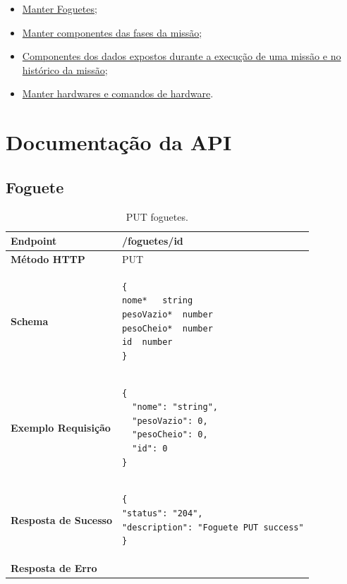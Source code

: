 \begin{apendicesenv}
\begin{itemize} 
    \item \href{https://github.com/Ground-Station/frontend/tree/material/ground-station/src/views/Rocket}{Manter Foguetes};
    \item \href{https://github.com/Ground-Station/frontend/tree/material/ground-station/src/views/Mission}{Manter componentes das fases da missão};
    \item \href{https://github.com/Ground-Station/frontend/tree/material/ground-station/src/views/Mission/MissionData}{Componentes dos dados expostos durante a execução de uma missão e no histórico da missão};
    \item \href{https://github.com/Ground-Station/frontend/tree/material/ground-station/src/views/Hardware}{Manter hardwares e comandos de hardware}.
\end{itemize}

\chapter{Documentação da API}
\label{documentacao_api}

\section{Foguete}
\begin{table}[H]
\begin{tabular}{|l|l|}
\hline
\textbf{Endpoint}            & /foguetes/{id} \\ \hline
\textbf{Método HTTP}         & PUT \\ \hline
\textbf{Schema}              &  
\begin{lstlisting}
{
nome*	string
pesoVazio*	number
pesoCheio*	number
id	number
}
\end{lstlisting}\\ \hline
\textbf{Exemplo Requisição}  &  
\begin{lstlisting}
{
  "nome": "string",
  "pesoVazio": 0,
  "pesoCheio": 0,
  "id": 0
}
\end{lstlisting}
\\ \hline
\textbf{Resposta de Sucesso} & 
\begin{lstlisting}
{
"status": "204",
"description": "Foguete PUT success"
}
\end{lstlisting}
\\ \hline
\textbf{Resposta de Erro}    &  \\ \hline
\end{tabular}
\caption{PUT foguetes.}
\label{put_foguetes}
\end{table}


\end{apendicesenv}
